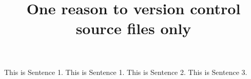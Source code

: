 \documentclass{article}
\title{One reason to version control source files only}
\begin{document}
\maketitle


This is Sentence 1.
This is Sentence 1.
This is Sentence 2.
This is Sentence 3.
\end{document}
